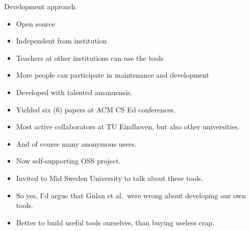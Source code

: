 \begin{frame}[fragile]
  \begin{block}{Development approach}
    \begin{itemize}
      \item Open source
      \item Independent from institution
    \end{itemize}
  \end{block}

  \pause

  \begin{example}[Advantages]
    \begin{itemize}
      \item Teachers at other institutions can use the tools
      \item More people can participate in maintenance and 
        development
    \end{itemize}
  \end{example}
\end{frame}

\begin{frame}
  \begin{example}[RepoBee]
    \begin{itemize}
      \item Developed with talented amanuensis.
      \item Yielded six (6) papers at ACM CS Ed conferences.
      \item Most active collaborators at TU Eindhoven, but also other 
        universities.
      \item And of course many anonymous users.
      \item Now self-supporting OSS project.
    \end{itemize}
  \end{example}

  \pause

  \begin{example}
    \begin{itemize}
      \item Invited to Mid Sweden University to talk about these tools.
    \end{itemize}
  \end{example}
\end{frame}

\begin{frame}[fragile]
  \begin{remark}
    \begin{itemize}
      \item So yes, I'd argue that Gulan et al.~were wrong about developing our 
        own tools.
      \item Better to build useful tools ourselves, than buying useless crap.
    \end{itemize}
  \end{remark}
\end{frame}

